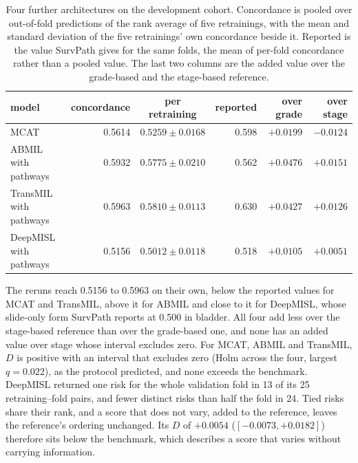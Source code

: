 \documentclass[11pt]{article}
\begin{document}
\begin{table}[h]
\centering
{\small
\setlength{\tabcolsep}{4pt}
\begin{tabular}{lrcrrr}
\toprule
model & concordance & per retraining & reported & over grade & over stage \\
\midrule
MCAT & 0.5614 & $0.5259 \pm 0.0168$ & 0.598 & $+0.0199$ & $-0.0124$ \\
ABMIL with pathways & 0.5932 & $0.5775 \pm 0.0210$ & 0.562 & $+0.0476$ & $+0.0151$ \\
TransMIL with pathways & 0.5963 & $0.5810 \pm 0.0113$ & 0.630 & $+0.0427$ & $+0.0126$ \\
DeepMISL with pathways & 0.5156 & $0.5012 \pm 0.0118$ & 0.518 & $+0.0105$ & $+0.0051$ \\
\bottomrule
\end{tabular}}
\caption{Four further architectures on the development cohort. Concordance is pooled over
out-of-fold predictions of the rank average of five retrainings, with the mean and standard deviation
of the five retrainings' own concordance beside it. Reported is the value SurvPath gives for the same folds, the mean of per-fold
concordance rather than a pooled value. The last two columns are the added value over the grade-based
and the stage-based reference.}
\label{tab:architectures}
\end{table}

The reruns reach 0.5156 to 0.5963 on their own, below the reported values for MCAT and TransMIL,
above it for ABMIL and close to it for DeepMISL, whose slide-only form SurvPath reports at 0.500 in
bladder. All four add less over the stage-based reference than over the grade-based one, and none has
an added value over stage whose interval excludes zero. For MCAT, ABMIL and TransMIL, $D$ is positive
with an interval that excludes zero (Holm across the four, largest $q=0.022$), as the protocol
predicted, and none exceeds the benchmark. DeepMISL returned one risk for the whole validation fold
in 13 of its 25 retraining--fold pairs, and fewer distinct risks than half the fold in 24. Tied risks
share their rank, and a score that does not vary, added to the reference, leaves the reference's
ordering unchanged. Its $D$ of $+0.0054$ ($[-0.0073, +0.0182]$) therefore sits below the benchmark,
which describes a score that varies without carrying information.
\end{document}
